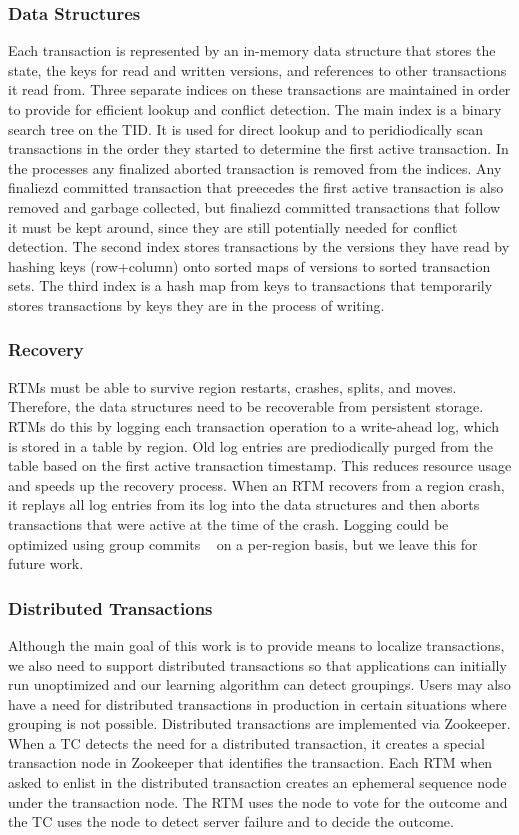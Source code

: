 \documentclass[10pt,final,journal]{IEEEtran}
\begin{document}
\subsubsection{Data Structures}
Each transaction is represented by an in-memory data structure that stores the state, the keys for read and written versions, and references to other transactions it read from. Three separate indices on these transactions are maintained in order to provide for efficient lookup and conflict detection. The main index is a binary search tree on the TID. It is used for direct lookup and to peridiodically scan transactions in the order they started to determine the first active transaction. In the processes any finalized aborted transaction is removed from the indices. Any finaliezd committed transaction that preecedes the first active transaction is also removed and garbage collected, but finaliezd committed transactions that follow it must be kept around, since they are still potentially needed for conflict detection. The second index stores transactions by the versions they have read by hashing keys (row+column) onto sorted maps of versions to sorted transaction sets. The third index is a hash map from keys to transactions that temporarily stores transactions by keys they are in the process of writing.

\subsubsection{Recovery}
RTMs must be able to survive region restarts, crashes, splits, and moves. Therefore, the data structures need to be recoverable from persistent storage. RTMs do this by logging each transaction operation to a write-ahead log, which is stored in a table by region. Old log entries are prediodically purged from the table based on the first active transaction timestamp. This reduces resource usage and speeds up the recovery process. When an RTM recovers from a region crash, it replays all log entries from its log into the data structures and then aborts transactions that were active at the time of the crash. Logging could be optimized using group commits ~\cite{Weikum:2001:TIS} on a per-region basis, but we leave this for future work.

\subsubsection{Distributed Transactions}
Although the main goal of this work is to provide means to localize transactions, we also need to support distributed transactions so that applications can initially run unoptimized and our learning algorithm can detect groupings. Users may also have a need for distributed transactions in production in certain situations where grouping is not possible. Distributed transactions are implemented via Zookeeper. When a TC detects the need for a distributed transaction, it creates a special transaction node in Zookeeper that identifies the transaction. Each RTM when asked to enlist in the distributed transaction creates an ephemeral sequence node under the transaction node. The RTM uses the node to vote for the outcome and the TC uses the node to detect server failure and to decide the outcome.
\end{document}
